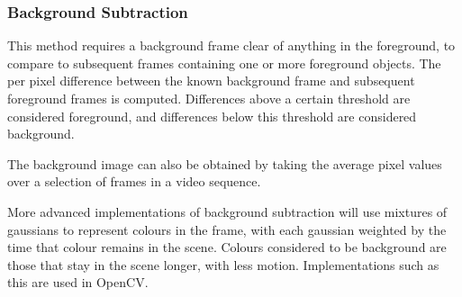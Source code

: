 \subsubsection{Background Subtraction}

This method requires a background frame clear of anything in the foreground, to compare to subsequent frames containing one or more foreground objects. The per pixel difference between the known background frame and subsequent foreground frames is computed. Differences above a certain threshold are considered foreground, and differences below this threshold are considered background.

The background image can also be obtained by taking the average pixel values over a selection of frames in a video sequence.

More advanced implementations of background subtraction will use mixtures of gaussians to represent colours in the frame, with each gaussian weighted by the time that colour remains in the scene\cite{backgroundsubmog}. Colours considered to be background are those that stay in the scene longer, with less motion. Implementations such as this are used in OpenCV\cite{opencv}.